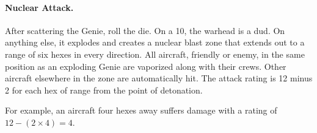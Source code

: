 \begin{advancedrules}
{\paragraph{Nuclear Attack.} After scattering the Genie, roll the die. On a 10, the warhead is a dud. On anything else, it explodes and creates a nuclear blast zone that extends out to a range of six hexes in every direction. All aircraft, friendly or enemy, in the same position as an exploding Genie are vaporized along with their crews. Other aircraft elsewhere in the zone are automatically hit. The attack rating is 12 minus 2 for each hex of range from the point of detonation.

For example, an aircraft four hexes away suffers damage with a rating of $12 - (2 \times 4) = 4$.

}
\end{advancedrules}
